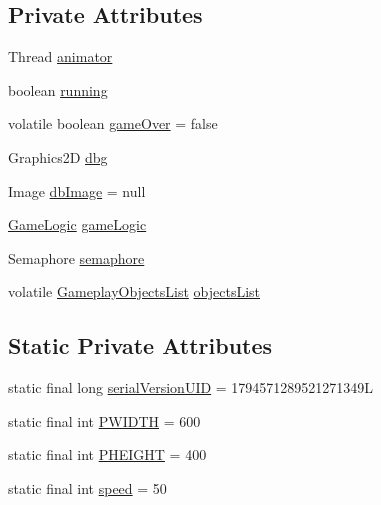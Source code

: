 \subsection*{Private Attributes}
\begin{DoxyCompactItemize}
\item 
Thread \hyperlink{classMapPanel_a2f4861c001b00d173bbad5573eb7fda7}{animator}
\item 
boolean \hyperlink{classMapPanel_a2af536efa9e8a4df2d0bef98b427a878}{running}
\item 
volatile boolean \hyperlink{classMapPanel_afaa79c91a69c6ce1e1edd062e066da06}{game\-Over} = false
\item 
Graphics2\-D \hyperlink{classMapPanel_ad691832c9f6f90db5bed90f359ce46fc}{dbg}
\item 
Image \hyperlink{classMapPanel_aad322f3de5764d74d0da0ee2862e1da4}{db\-Image} = null
\item 
\hyperlink{classGameLogic}{Game\-Logic} \hyperlink{classMapPanel_a2ea62977a77f6de53552a52d7f99bb9e}{game\-Logic}
\item 
Semaphore \hyperlink{classMapPanel_a94fbd1f030f19c4f0841defc21fe81b2}{semaphore}
\item 
volatile \hyperlink{classGameplayObjectsList}{Gameplay\-Objects\-List} \hyperlink{classMapPanel_a636653ac7ebbff9faf60f89bfb3887ab}{objects\-List}
\end{DoxyCompactItemize}
\subsection*{Static Private Attributes}
\begin{DoxyCompactItemize}
\item 
static final long \hyperlink{classMapPanel_a63b76f204807ce3eefbe8e01a80359d6}{serial\-Version\-U\-I\-D} = 1794571289521271349\-L
\item 
static final int \hyperlink{classMapPanel_a78dbdc3c4f055e777934bf965835ecdc}{P\-W\-I\-D\-T\-H} = 600
\item 
static final int \hyperlink{classMapPanel_ab568855b8c5789ced1e76c48046c1775}{P\-H\-E\-I\-G\-H\-T} = 400
\item 
static final int \hyperlink{classMapPanel_ac8a10b9f2d89e400c0b9ad615459a35c}{speed} = 50
\end{DoxyCompactItemize}


